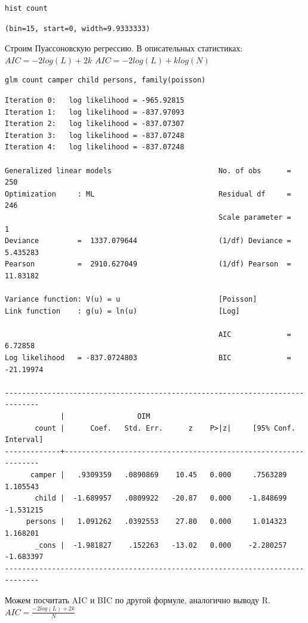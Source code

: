 \documentclass[]{book}
\begin{document}
\begin{verbatim}
hist count
\end{verbatim}

\begin{verbatim}
(bin=15, start=0, width=9.9333333)
\end{verbatim}

Строим Пуассоновскую регрессию.
В описательных статистиках:
\(AIC = -2log(L) + 2k\)
\(AIC = -2log(L) + klog(N)\)

\begin{verbatim}
glm count camper child persons, family(poisson)
\end{verbatim}

\begin{verbatim}
Iteration 0:   log likelihood = -965.92815  
Iteration 1:   log likelihood = -837.97093  
Iteration 2:   log likelihood = -837.07307  
Iteration 3:   log likelihood = -837.07248  
Iteration 4:   log likelihood = -837.07248  

Generalized linear models                         No. of obs      =        250
Optimization     : ML                             Residual df     =        246
                                                  Scale parameter =          1
Deviance         =  1337.079644                   (1/df) Deviance =   5.435283
Pearson          =  2910.627049                   (1/df) Pearson  =   11.83182

Variance function: V(u) = u                       [Poisson]
Link function    : g(u) = ln(u)                   [Log]

                                                  AIC             =    6.72858
Log likelihood   = -837.0724803                   BIC             =  -21.19974

------------------------------------------------------------------------------
             |                 OIM
       count |      Coef.   Std. Err.      z    P>|z|     [95% Conf. Interval]
-------------+----------------------------------------------------------------
      camper |   .9309359   .0890869    10.45   0.000     .7563289    1.105543
       child |  -1.689957   .0809922   -20.87   0.000    -1.848699   -1.531215
     persons |   1.091262   .0392553    27.80   0.000     1.014323    1.168201
       _cons |  -1.981827    .152263   -13.02   0.000    -2.280257   -1.683397
------------------------------------------------------------------------------
\end{verbatim}

Можем посчитать AIC и BIC по другой формуле, аналогично выводу R.
\(AIC = \frac {-2log(L) + 2k}{N}\)
\end{document}
